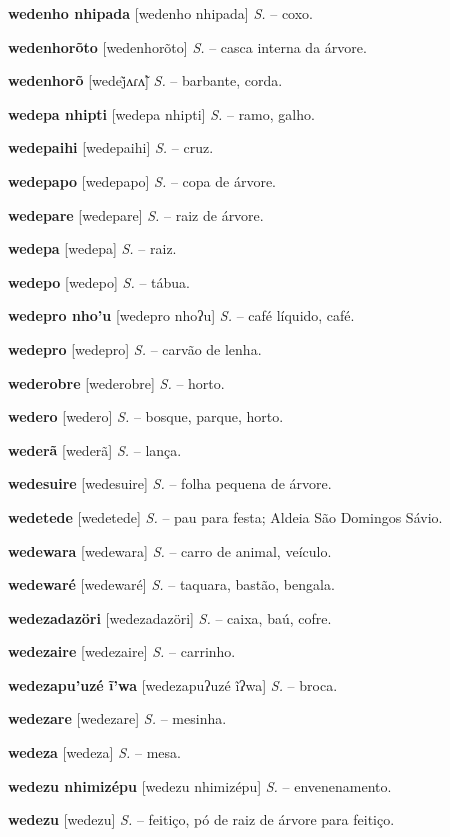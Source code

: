 \textbf{wedenho nhipada} [wedenho nhipada] \textit{S.} -- coxo.

\textbf{wedenhorõto} [wedenhorõto] \textit{S.} -- casca interna da árvore.

\textbf{wedenhorõ} [wedej̃ʌɾʌ̃] \textit{S.} -- barbante, corda.

\textbf{wedepa nhipti} [wedepa nhipti] \textit{S.} -- ramo, galho.

\textbf{wedepaihi} [wedepaihi] \textit{S.} -- cruz.

\textbf{wedepapo} [wedepapo] \textit{S.} -- copa de árvore.

\textbf{wedepare} [wedepare] \textit{S.} -- raiz de árvore.

\textbf{wedepa} [wedepa] \textit{S.} -- raiz.

\textbf{wedepo} [wedepo] \textit{S.} -- tábua.

\textbf{wedepro nho'u} [wedepro nhoʔu] \textit{S.} -- café líquido, café.

\textbf{wedepro} [wedepro] \textit{S.} -- carvão de lenha.

\textbf{wederobre} [wederobre] \textit{S.} -- horto.

\textbf{wedero} [wedero] \textit{S.} -- bosque, parque, horto.

\textbf{wederã} [wederã] \textit{S.} -- lança.

\textbf{wedesuire} [wedesuire] \textit{S.} -- folha pequena de árvore.

\textbf{wedetede} [wedetede] \textit{S.} -- pau para festa; Aldeia São Domingos Sávio.

\textbf{wedewara} [wedewara] \textit{S.} -- carro de animal, veículo.

\textbf{wedewaré} [wedewaré] \textit{S.} -- taquara, bastão, bengala.

\textbf{wedezadazöri} [wedezadazöri] \textit{S.} -- caixa, baú, cofre.

\textbf{wedezaire} [wedezaire] \textit{S.} -- carrinho.

\textbf{wedezapu'uzé ĩ'wa} [wedezapuʔuzé ĩʔwa] \textit{S.} -- broca.

\textbf{wedezare} [wedezare] \textit{S.} -- mesinha.

\textbf{wedeza} [wedeza] \textit{S.} -- mesa.

\textbf{wedezu nhimizépu} [wedezu nhimizépu] \textit{S.} -- envenenamento.

\textbf{wedezu} [wedezu] \textit{S.} -- feitiço, pó de raiz de árvore para feitiço.

